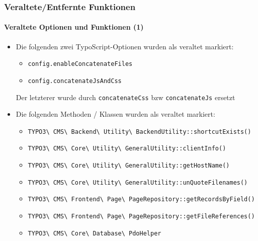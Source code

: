 \begin{frame}[fragile]
	\frametitle{Veraltete/Entfernte Funktionen}
	\framesubtitle{Veraltete Optionen und Funktionen (1)}

	\begin{itemize}
		\item Die folgenden zwei TypoScript-Optionen wurden als veraltet markiert:

			\begin{itemize}\smaller
                \item \texttt{config.enableConcatenateFiles}
                \item \texttt{config.concatenateJsAndCss}
            \end{itemize}

        	\smaller
				Der letzterer wurde durch \texttt{concatenateCss} bzw
					\texttt{concatenateJs} ersetzt
			\normalsize

		\item Die folgenden Methoden / Klassen wurden als veraltet markiert:

			\begin{itemize}\smaller
				\item \texttt{TYPO3\textbackslash
					CMS\textbackslash
					Backend\textbackslash
					Utility\textbackslash
					BackendUtility::shortcutExists()}

				\item \texttt{TYPO3\textbackslash
					CMS\textbackslash
					Core\textbackslash
					Utility\textbackslash
					GeneralUtility::clientInfo()}

				\item \texttt{TYPO3\textbackslash
					CMS\textbackslash
					Core\textbackslash
					Utility\textbackslash
					GeneralUtility::getHostName()}

				\item \texttt{TYPO3\textbackslash
					CMS\textbackslash
					Core\textbackslash
					Utility\textbackslash
					GeneralUtility::unQuoteFilenames()}

				\item \texttt{TYPO3\textbackslash
					CMS\textbackslash
					Frontend\textbackslash
					Page\textbackslash
					PageRepository::getRecordsByField()}

				\item \texttt{TYPO3\textbackslash
					CMS\textbackslash
					Frontend\textbackslash
					Page\textbackslash
					PageRepository::getFileReferences()}

				\item \texttt{TYPO3\textbackslash
					CMS\textbackslash
					Core\textbackslash
					Database\textbackslash
					PdoHelper}

			\end{itemize}
	\end{itemize}

\end{frame}

